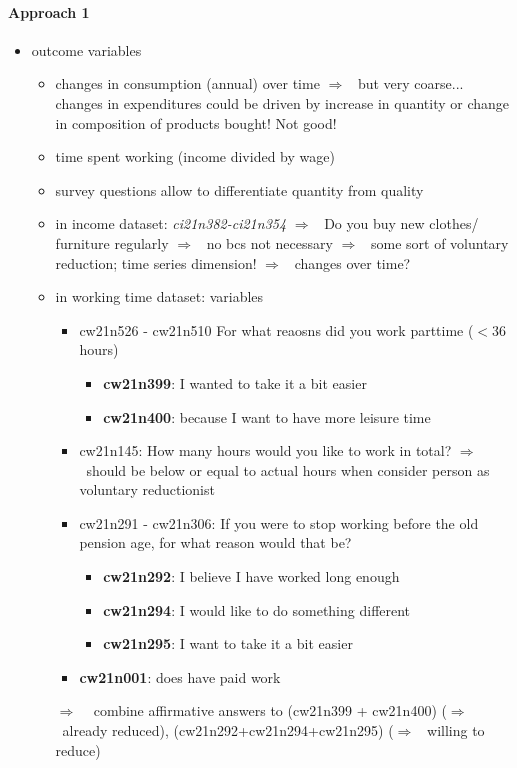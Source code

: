 \documentclass[12pt]{article}
\newcommand{\ar}{$\Rightarrow$ \ }
\begin{document}
\paragraph{Approach 1}
\begin{itemize}
	\item outcome variables
	\begin{itemize}

\item changes in consumption (annual) over time \ar but very coarse... changes in expenditures could be driven by increase in quantity or change in composition of products bought! Not good!
\item time spent working (income divided by wage)
\item survey questions allow to differentiate quantity from quality 
\item in income dataset: \textit{ci21n382-ci21n354} \ar Do you buy new clothes/ furniture regularly \ar no bcs not necessary \ar some sort of voluntary reduction; time series dimension! \ar changes over time?
\item in working time dataset: variables
\begin{itemize}
\item cw21n526 - cw21n510 For what reaosns did you work parttime ($<$36 hours)
\begin{itemize}
\item \textbf{cw21n399}: I wanted to take it a bit easier
\item \textbf{cw21n400}: because I want to have more leisure time
\end{itemize}
\item cw21n145: How many hours would you like to work in total? \ar should be below or equal to actual hours when consider person as voluntary reductionist
\item cw21n291 - cw21n306: If you were to stop working before the old pension age, for what reason would that be?
\begin{itemize}
\item \textbf{cw21n292}: I believe I have worked long enough
\item \textbf{cw21n294}: I would like to do something different
\item \textbf{cw21n295}: I want to take it a bit easier
\end{itemize}
\item \textbf{cw21n001}: does have paid work
\end{itemize}
\item[\ar] combine affirmative answers to (cw21n399 + cw21n400) (\ar already reduced), (cw21n292+cw21n294+cw21n295) (\ar willing to reduce)

\end{itemize}
\end{itemize}
\end{document}
